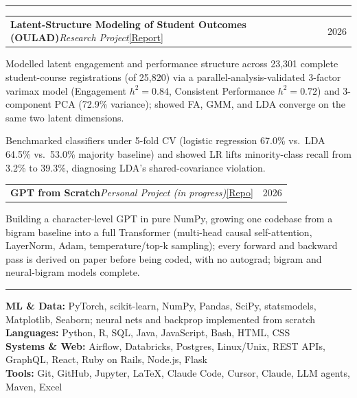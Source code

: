 \documentclass[letterpaper,10pt]{article}
\makeatletter
\newcommand{\Section}[1]{\vspace{4pt}{\large\bfseries #1}\vspace{1pt}\hrule\vspace{3pt}}
\newcommand{\projentry}[2]{%
  \vspace{2pt}%
  \begin{tabular*}{\textwidth}{@{}l@{\extracolsep{\fill}}r@{}}
    #1 & #2 \\
  \end{tabular*}\vspace{-4pt}}
\newenvironment{bullets}%
  {\begin{list}{\textbullet}{%
     \setlength{\leftmargin}{1.3em}\setlength{\labelsep}{0.5em}%
     \setlength{\itemsep}{1.5pt}\setlength{\topsep}{2pt}%
     \setlength{\parsep}{0pt}\setlength{\partopsep}{0pt}}}%
  {\end{list}}
\makeatother
\begin{document}
\Section{Projects}
\projentry{\textbf{Latent-Structure Modeling of Student Outcomes (OULAD)}\quad\textit{Research Project}\quad\href{https://avi-gobrin.github.io/personal-site/assets/oulad-sta437.pdf}{[Report]}}{2026}
\begin{bullets}
  \item Modelled latent engagement and performance structure across 23,301 complete student-course registrations (of 25,820) via a parallel-analysis-validated 3-factor varimax model (Engagement $h^2 = 0.84$, Consistent Performance $h^2 = 0.72$) and 3-component PCA (72.9\% variance); showed FA, GMM, and LDA converge on the same two latent dimensions.
  \item Benchmarked classifiers under 5-fold CV (logistic regression 67.0\% vs.\ LDA 64.5\% vs.\ 53.0\% majority baseline) and showed LR lifts minority-class recall from 3.2\% to 39.3\%, diagnosing LDA's shared-covariance violation.
\end{bullets}
\projentry{\textbf{GPT from Scratch}\quad\textit{Personal Project (in progress)}\quad\href{https://github.com/Avi-Gobrin/tiny-gpt-from-scratch}{[Repo]}}{2026}
\begin{bullets}
  \item Building a character-level GPT in pure NumPy, growing one codebase from a bigram baseline into a full Transformer (multi-head causal self-attention, LayerNorm, Adam, temperature/top-k sampling); every forward and backward pass is derived on paper before being coded, with no autograd; bigram and neural-bigram models complete.
\end{bullets}
\Section{Technical Skills}
\textbf{ML \& Data:} PyTorch, scikit-learn, NumPy, Pandas, SciPy, statsmodels, Matplotlib, Seaborn; neural nets and backprop implemented from scratch \\
\textbf{Languages:} Python, R, SQL, Java, JavaScript, Bash, HTML, CSS \\
\textbf{Systems \& Web:} Airflow, Databricks, Postgres, Linux/Unix, REST APIs, GraphQL, React, Ruby on Rails, Node.js, Flask \\
\textbf{Tools:} Git, GitHub, Jupyter, \LaTeX, Claude Code, Cursor, Claude, LLM agents, Maven, Excel
\end{document}
